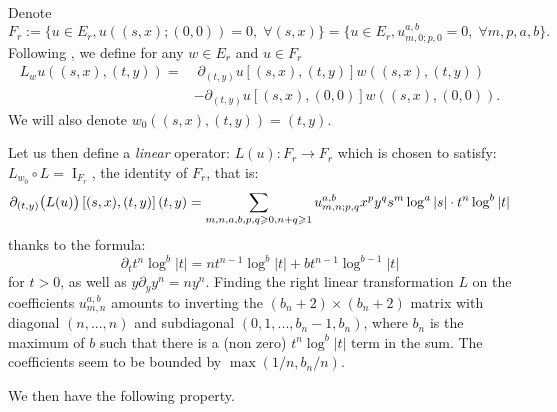 \documentclass[12pt]{article}
\begin{document}
    Denote $$F_r:=\{u\in E_r, u((s,x);(0,0))=0,\; \forall (s,x)\} =  \{u\in E_r, u_{m,0;p,0}^{a,b}=0, \; \forall m,p,a,b\}.$$ 
    Following \cite{bt}, we define for any $w\in E_r$ and $u\in F_r$
    \begin{align*}
        L_wu((s,x),(t,y)) =&\; \partial_{(t,y)} u\left[(s,x),(t,y)\right] w ((s,x),(t,y)) \\
        &-\partial_{(t,y)}u\left[(s,x),(0,0)\right] w ((s,x),(0,0)).
    \end{align*}
    We will also denote $w_0((s,x),(t,y)) = (t,y)$.
    
    Let us then define a \emph{linear} operator:
    $L(u): F_r\to F_r$
    which is chosen to satisfy: $ L_{w_0} \circ L = \operatorname{I}_{F_r}$, the identity of $F_r$, that is:
    \begin{equation}
        \partial_{(t,y)} \big(L(u)\big)\left[(s,x),(t,y)\right](t,y) = \sum_{m,n,a,b,p,q\geqslant 0,\\ n+q\geqslant1} u_{m,n;p,q}^{a,b} x^py^qs^m\log^a|s|\cdot
             t^n\log^b|t|\label{prop Lu}
    \end{equation}
    thanks to the formula:
    $$ \partial_{t} t^n\log^b|t| = nt^{n-1}\log^{b}|t| + bt^{n-1}\log^{b-1}|t|$$
    for $t>0$, as well as $ y\partial_yy^n = n y^n$. Finding the right linear transformation $L$ on the coefficients $u_{m,n}^{a,b}$ amounts to inverting the $(b_n+2)\times (b_n+2)$ matrix with diagonal $(n,...,n)$ and subdiagonal $(0,1,...,b_n-1,b_n)$, where $b_n$ is the maximum of $b$ such that there is a (non zero) $t^n\log^b|t|$ term in the sum. The coefficients seem to be bounded by $\max(1/n,b_n/n)$.
    
    
    We then have the following property.
    
\end{document}
